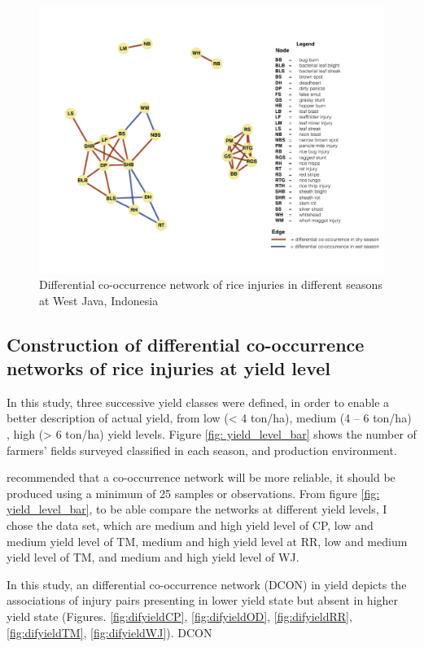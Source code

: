\begin{figure}
\centering
\includegraphics[width = 1\textwidth]{figures/difseasonWJ.pdf}
\caption{Differential co-occurrence network of rice injuries in different seasons at West Java, Indonesia}
\label{fig:difseasonWJ}
\end{figure}

\subsection{Construction of differential co-occurrence networks of rice injuries at yield level}

In this study, three successive yield classes were defined, in order to enable a better description of actual yield, from low (< 4 ton/ha), medium (4 – 6 ton/ha) ,  high (> 6 ton/ha) yield levels. Figure \ref{fig: yield_level_bar} shows the number of farmers’ fields surveyed classified in each season, and production environment.

\citet{Berry_2014_Deciphering} recommended that a co-occurrence network will be more reliable, it should be produced using a minimum of 25 samples or observations. From figure \ref{fig: yield_level_bar}, to be able compare the networks at different yield levels, I chose the data set, which are medium and high yield level of CP, low and medium yield level of TM, medium and high yield level at RR, low and medium yield level of TM, and medium and high yield level of WJ. 

In this study, an differential co-occurrence network (DCON) in yield depicts the associations of injury pairs presenting in lower yield state but absent in higher yield state (Figures. \ref{fig:difyieldCP}, \ref{fig:difyieldOD}, \ref{fig:difyieldRR}, \ref{fig:difyieldTM}, \ref{fig:difyieldWJ}).  DCON

